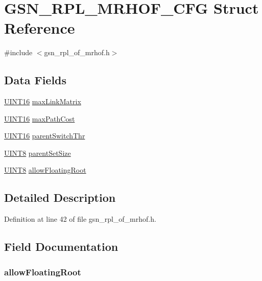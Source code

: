 \hypertarget{a00206}{
\section{GSN\_\-RPL\_\-MRHOF\_\-CFG Struct Reference}
\label{a00206}
}


{\ttfamily \#include $<$gsn\_\-rpl\_\-of\_\-mrhof.h$>$}

\subsection*{Data Fields}
\begin{DoxyCompactItemize}
\item 
\hyperlink{a00660_ga09f1a1fb2293e33483cc8d44aefb1eb1}{UINT16} \hyperlink{a00206_a516d2a85f12de9d5df0cd4d114ceef53}{maxLinkMatrix}
\item 
\hyperlink{a00660_ga09f1a1fb2293e33483cc8d44aefb1eb1}{UINT16} \hyperlink{a00206_aedf601ed094c3bf181e20d300d14f245}{maxPathCost}
\item 
\hyperlink{a00660_ga09f1a1fb2293e33483cc8d44aefb1eb1}{UINT16} \hyperlink{a00206_ac1656804b7e4feec1bf5a4425d9635f6}{parentSwitchThr}
\item 
\hyperlink{a00660_gab27e9918b538ce9d8ca692479b375b6a}{UINT8} \hyperlink{a00206_af94e49d3425a329fe5efb7acf39d22a0}{parentSetSize}
\item 
\hyperlink{a00660_gab27e9918b538ce9d8ca692479b375b6a}{UINT8} \hyperlink{a00206_a0fe428717bf377cf5132665d3452c62d}{allowFloatingRoot}
\end{DoxyCompactItemize}


\subsection{Detailed Description}


Definition at line 42 of file gsn\_\-rpl\_\-of\_\-mrhof.h.



\subsection{Field Documentation}
\hypertarget{a00206_a0fe428717bf377cf5132665d3452c62d}{
\subsubsection[{allowFloatingRoot}]{ {\bf allowFloatingRoot}}}
\label{a00206_a0fe428717bf377cf5132665d3452c62d}


